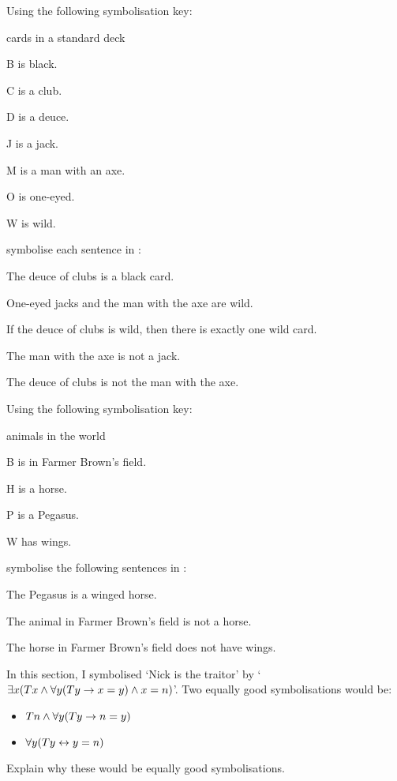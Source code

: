 \problempart
\label{pr.FOLcards}
Using the following symbolisation key:
\begin{ekey}
\item[\text{domain}] cards in a standard deck
\item[B]  is black.
\item[C]  is a club.
\item[D]  is a deuce.
\item[J]  is a jack.
\item[M]  is a man with an axe.
\item[O]  is one-eyed.
\item[W]  is wild.
\end{ekey}
symbolise each sentence in \FOL:
\begin{earg}
\item The deuce of clubs is a black card.
\item One-eyed jacks and the man with the axe are wild.
\item If the deuce of clubs is wild, then there is exactly one wild card.
\item The man with the axe is not a jack.
\item The deuce of clubs is not the man with the axe.
\end{earg}


\problempart Using the following symbolisation key:
\begin{ekey}
\item[\text{domain}] animals in the world
\item[B]  is in Farmer Brown's field.
\item[H]  is a horse.
\item[P]  is a Pegasus.
\item[W]  has wings.
\end{ekey}
symbolise the following sentences in \FOL:
\begin{earg}
\item The Pegasus is a winged horse.
\item The animal in Farmer Brown's field is not a horse.
\item The horse in Farmer Brown's field does not have wings.
\end{earg}

\problempart
In this section, I symbolised `Nick is the traitor' by `$\exists x (Tx \wedge \forall y(Ty \rightarrow x = y) \wedge x = n)$'. Two equally good symbolisations would be:
	\begin{itemize}
		\item $Tn \wedge \forall y(Ty \rightarrow n = y)$
		\item $\forall y(Ty \leftrightarrow y = n)$
	\end{itemize}
Explain why these would be equally good symbolisations.

